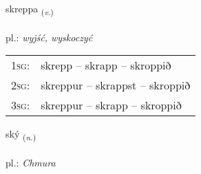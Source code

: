 \documentclass[frontgrid, backgrid]{flacards}\usepackage[]{graphicx}\usepackage[]{xcolor}
\begin{document}
\renewcommand{\flhead}{\vskip5pt \fboxsep=0pt {\small\bfseries\footnotesize Sagnorð | czasownik}}
\renewcommand{\fcfoot}{\vskip5pt \fboxsep=0pt \hspace{2pt}{\small\bfseries\footnotesize 3K}}

\renewcommand{\blhead}{\vskip5pt {\small\bfseries\footnotesize Sagnorð | czasownik }}
\renewcommand{\bcfoot}{\vskip5pt \hspace{2pt}{\small\bfseries\footnotesize 3K}}


{skreppa \small{\textsubscript{(\textit{v.})}} \\[1ex] %
\textphonetic{[skrɛhpa]} \\
pl.: \emph{wyjść, wyskoczyć} \\  [2ex]
\renewcommand*{\arraystretch}{0.8}
\begin{tabular}{p{1cm}l}
\textsc{1sg}: & skrepp -- skrapp -- skroppið \\ 
\textsc{2sg}: & skreppur -- skrappst -- skroppið \\ 
\textsc{3sg}: & skreppur -- skrapp -- skroppið \\ 
\end{tabular}
}

\renewcommand{\flhead}{\vskip5pt \fboxsep=0pt {\small\bfseries\footnotesize Nafnorð | rzeczownik}}
\renewcommand{\fcfoot}{\vskip5pt \fboxsep=0pt \hspace{2pt}{\small\bfseries\footnotesize 3K}}

\renewcommand{\blhead}{\vskip5pt {\small\bfseries\footnotesize Nafnorð | rzeczownik }}
\renewcommand{\bcfoot}{\vskip5pt \hspace{2pt}{\small\bfseries\footnotesize 3K}}


{ský \small{\textsubscript{(\textit{n.})}} \\[1ex] %
\textphonetic{[sciː]} \\
pl.: \emph{Chmura} \\  [2ex]
\renewcommand*{\arraystretch}{0.8}
}
\end{document}
